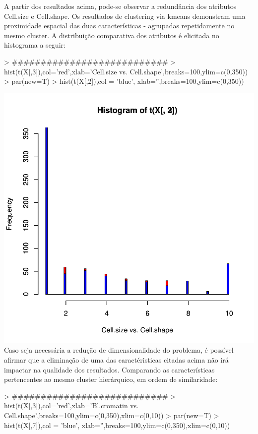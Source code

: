 \documentclass{article}
\begin{document}
A partir dos resultados acima, pode-se observar a redundância dos atributos Cell.size e Cell.shape. Os resultados de clustering via kmeans demonstram uma proximidade espacial das duas características - agrupadas repetidamente no mesmo cluster. A distribuição comparativa dos atributos é elicitada no histograma a seguir:
\begin{Schunk}
\begin{Sinput}
> ###########################
> hist(t(X[,3]),col='red',xlab='Cell.size vs. Cell.shape',breaks=100,ylim=c(0,350))
> par(new=T)
> hist(t(X[,2]),col = 'blue', xlab='',breaks=100,ylim=c(0,350))
\end{Sinput}
\end{Schunk}
\includegraphics{selecao-006}
Caso seja necessária a redução de dimensionalidade do problema, é possível afirmar que a eliminação de uma das caractéristicas citadas acima não irá impactar na qualidade dos resultados. 
Comparando as características pertencentes ao mesmo cluster hierárquico, em ordem de similaridade:
\begin{Schunk}
\begin{Sinput}
> ###########################
> hist(t(X[,3]),col='red',xlab='Bl.cromatin vs. Cell.shape',breaks=100,ylim=c(0,350),xlim=c(0,10))
> par(new=T)
> hist(t(X[,7]),col = 'blue', xlab='',breaks=100,ylim=c(0,350),xlim=c(0,10))
\end{Sinput}
\end{Schunk}
\end{document}
